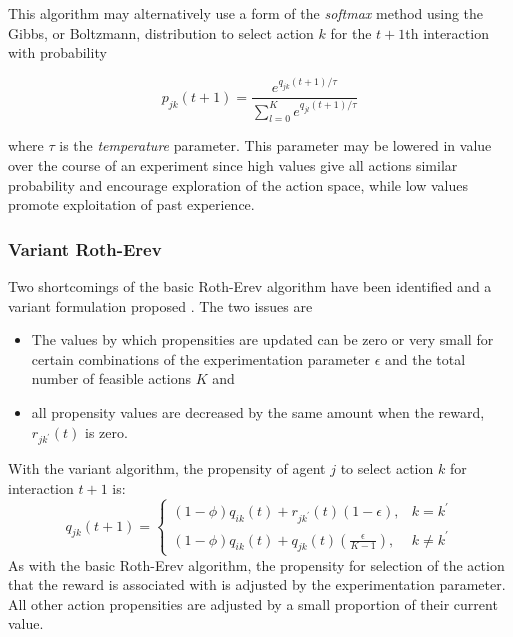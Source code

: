 This algorithm may alternatively use a form of the \textit{softmax} method
\cite{suttonbarto:1998} using the Gibbs, or Boltzmann, distribution to select
action $k$ for the $t+1$th interaction with probability

\begin{equation}
p_{jk}(t+1) = \frac{e^{q_{jk}(t+1)/\tau}}{\sum_{l=0}^K e^{q_{jl}(t+1)/\tau}}
\end{equation}

where $\tau$ is the \textit{temperature} parameter.  This parameter may be
lowered in value over the course of an experiment since high values give all
actions similar probability and encourage exploration of the action space,
while low values promote exploitation of past experience.

\subsubsection{Variant Roth-Erev}
\label{sec:variant}
Two shortcomings of the basic Roth-Erev algorithm have been identified and a
variant formulation proposed \cite{nicolaisen:2001}.  The two issues are
\begin{itemize}
  \item The values by which propensities are updated can be zero or very small
  for certain combinations of the experimentation parameter $\epsilon$ and
  the total number of feasible actions $K$ and
  \item all propensity values are decreased by the same amount when the reward,
  $r_{jk^\prime}(t)$ is zero.
\end{itemize}
With the variant algorithm, the propensity of agent $j$ to select action $k$
for interaction $t+1$ is:
\begin{equation}
q_{jk}(t+1) =
\begin{cases}
(1-\phi)q_{ik}(t) + r_{jk^\prime}(t)(1-\epsilon), & \text{$k = k^\prime$} \\
(1-\phi)q_{ik}(t) + q_{jk}(t)(\frac{\epsilon}{K-1}), & \text{$k \ne
k^\prime$}
\end{cases}
\end{equation}
As with the basic Roth-Erev algorithm, the propensity for selection of the
action that the reward is associated with is adjusted by the experimentation
parameter.  All other action propensities are adjusted by a small proportion of
their current value.

